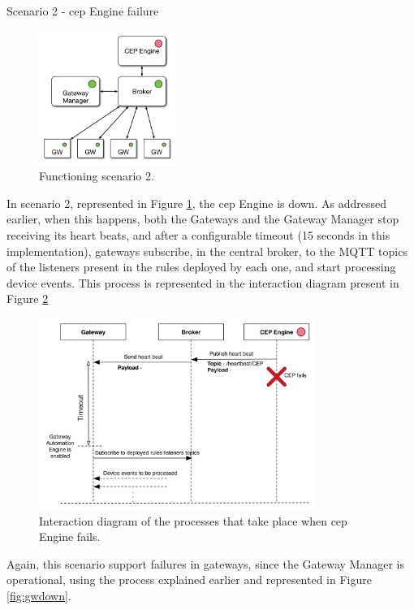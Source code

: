 \begin{Paragraph}{Scenario 2 - \ac{cep} Engine failure}
\begin{figure}[H]
	\centering
	\includegraphics[width=0.4\textwidth]{figures/fs2.png}
	\caption{Functioning scenario 2.}
	\label{fig:fs2}
\end{figure}

In scenario 2, represented in Figure \ref{fig:fs2}, the \ac{cep} Engine is down. As addressed earlier, when this happens, both the Gateways and the Gateway Manager stop receiving its heart beats, and after a configurable timeout (15 seconds in this implementation), gateways subscribe, in the central broker, to the MQTT topics of the listeners present in the rules deployed by each one, and start processing device events. This process is represented in the interaction diagram present in Figure \ref{fig:gae}

\begin{figure}[H]
	\centering
	\includegraphics[width=0.8\textwidth]{figures/gae.png}
	\caption{Interaction diagram of the processes that take place when \ac{cep} Engine fails.}
	\label{fig:gae}
\end{figure}

Again, this scenario support failures in gateways, since the Gateway Manager is operational, using the process explained earlier and represented in Figure \ref{fig:gwdown}.

\end{Paragraph}

